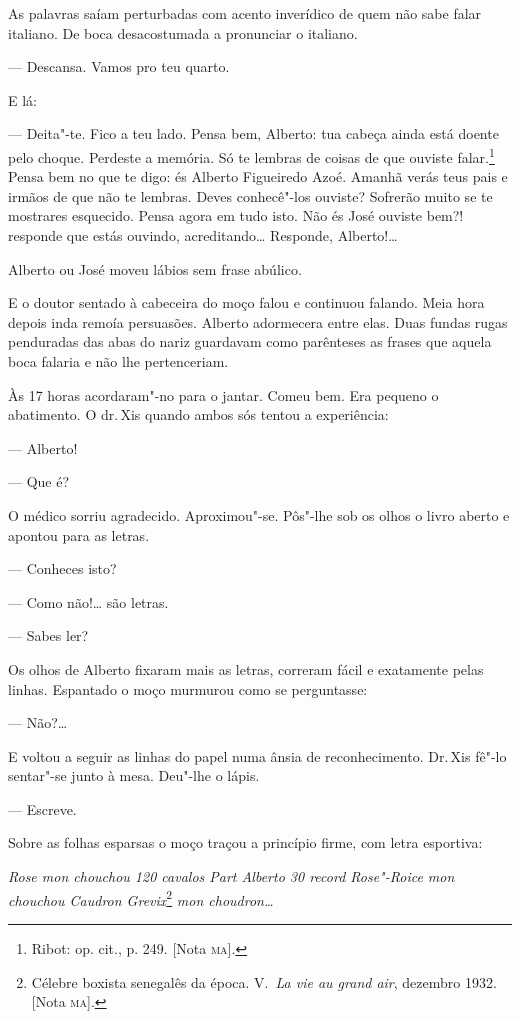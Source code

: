 \begin{linenumbers}
As palavras saíam perturbadas com acento inverídico de quem não sabe
falar italiano. De boca desacostumada a pronunciar o italiano.

--- Descansa. Vamos pro teu quarto.

E lá:

--- Deita"-te. Fico a teu lado. Pensa bem, Alberto: tua cabeça ainda está
doente pelo choque. Perdeste a memória. Só te lembras de coisas de que
ouviste falar.\footnote{Ribot: op. cit., p. 249. {[}Nota \textsc{ma}{]}.} Pensa
bem no que te digo: és Alberto Figueiredo Azoé. Amanhã verás teus pais e
irmãos de que não te lembras. Deves conhecê"-los ouviste? Sofrerão muito
se te mostrares esquecido. Pensa agora em tudo isto. Não és José ouviste
bem?! responde que estás ouvindo, acreditando\ldots{} Responde, Alberto!\ldots{}

Alberto ou José moveu lábios sem frase abúlico.

E o doutor sentado à cabeceira do moço falou e continuou falando. Meia
hora depois inda remoía persuasões. Alberto adormecera entre elas. Duas
fundas rugas penduradas das abas do nariz guardavam como parênteses as
frases que aquela boca falaria e não lhe pertenceriam.

Às 17 horas acordaram"-no para o jantar. Comeu bem. Era pequeno o
abatimento. O dr.\,Xis quando ambos sós tentou a experiência:

--- Alberto!

--- Que é?

O médico sorriu agradecido. Aproximou"-se. Pôs"-lhe sob os olhos o livro
aberto e apontou para as letras.

--- Conheces isto?

--- Como não!\ldots{} são letras.

--- Sabes ler?

Os olhos de Alberto fixaram mais as letras, correram fácil e exatamente
pelas linhas. Espantado o moço murmurou como se perguntasse:

--- Não?\ldots{}

E voltou a seguir as linhas do papel numa ânsia de reconhecimento. Dr.\,Xis fê"-lo sentar"-se junto à mesa. Deu"-lhe o lápis.

--- Escreve.

Sobre as folhas esparsas o moço traçou a princípio firme, com letra
esportiva:

\emph{Rose mon chouchou 120 cavalos Part Alberto 30 record Rose"-Roice
mon chouchou Caudron Grevix}\footnote{Célebre boxista senegalês da
  época. V.~\emph{La vie au grand air}, dezembro 1932. {[}Nota \textsc{ma}{]}.}
\emph{mon choudron\ldots{}}


\end{linenumbers}
